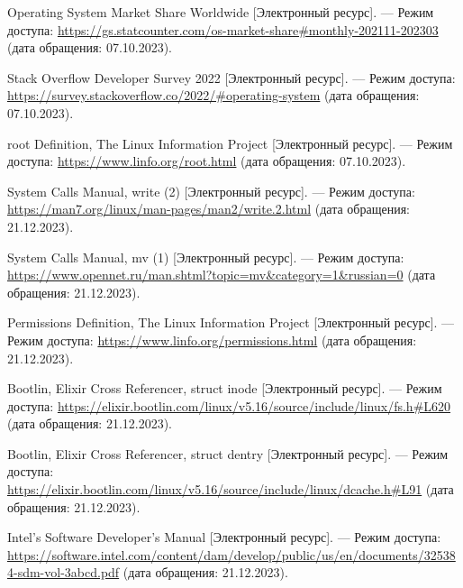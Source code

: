 \begin{thebibliography}{}
	Operating System Market Share Worldwide [Электронный ресурс]. --- Режим доступа: \url{https://gs.statcounter.com/os-market-share#monthly-202111-202303} (дата обращения: 07.10.2023).
	
	Stack Overflow Developer Survey 2022 [Электронный ресурс]. --- Режим доступа: \url{https://survey.stackoverflow.co/2022/#operating-system} (дата обращения: 07.10.2023).

	root Definition, The Linux Information Project [Электронный ресурс]. --- Режим доступа: \url{https://www.linfo.org/root.html} (дата обращения: 07.10.2023).
	
	System Calls Manual, write (2) [Электронный ресурс]. --- Режим доступа: \url{https://man7.org/linux/man-pages/man2/write.2.html} (дата обращения: 21.12.2023).

	System Calls Manual, mv (1) [Электронный ресурс]. --- Режим доступа: \url{https://www.opennet.ru/man.shtml?topic=mv&category=1&russian=0} (дата обращения: 21.12.2023).

	Permissions Definition, The Linux Information Project [Электронный ресурс]. --- Режим доступа: \url{https://www.linfo.org/permissions.html} (дата обращения: 21.12.2023).

	Bootlin, Elixir Cross Referencer, struct inode [Электронный ресурс]. --- Режим доступа: \url{https://elixir.bootlin.com/linux/v5.16/source/include/linux/fs.h#L620} (дата обращения: 21.12.2023).

	Bootlin, Elixir Cross Referencer, struct dentry [Электронный ресурс]. --- Режим доступа: \url{https://elixir.bootlin.com/linux/v5.16/source/include/linux/dcache.h#L91} (дата обращения: 21.12.2023).

	Intel's Software Developer's Manual [Электронный ресурс]. --- Режим доступа: \url{https://software.intel.com/content/dam/develop/public/us/en/documents/325384-sdm-vol-3abcd.pdf} (дата обращения: 21.12.2023).


\end{thebibliography}
